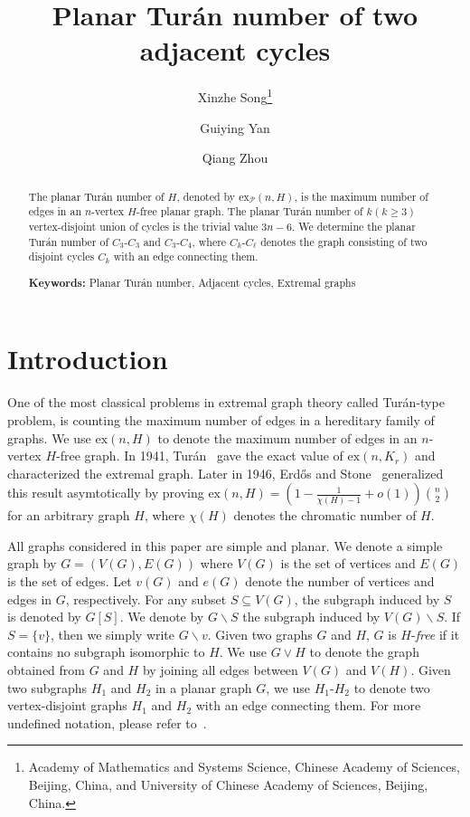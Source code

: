 \documentclass[12pt]{article}
\title{Planar Tur\'an number of two adjacent cycles}
\author{Xinzhe Song\thanks{Academy of Mathematics and Systems Science, Chinese Academy of Sciences, Beijing, China, and University of Chinese Academy of Sciences, Beijing, China.}
\and Guiying Yan\footnotemark[1]
\and Qiang Zhou\footnotemark[1]
}
\date{}
\newcommand{\ex}{\mathrm{ex}}
\begin{document}
\maketitle

\begin{abstract}
The planar Tur\'an number of $H$, denoted by $\ex_{\mathcal{P}}(n,H)$, is the maximum number of edges in an $n$-vertex $H$-free planar graph. The planar Tur\'an number of $k(k\geq 3)$ vertex-disjoint union of cycles is the trivial value $3n-6$. We determine the planar Tur\'an number of $C_{3}\text{-}C_{3}$ and $C_{3}\text{-}C_{4}$, where $C_{k}\text{-}C_{\ell}$ denotes the graph consisting of two disjoint cycles $C_k$ with an edge connecting them.


\textbf{Keywords:} Planar Tur\'an number, Adjacent cycles, Extremal graphs
\end{abstract}


\maketitle
\section{Introduction}

One of the most classical problems in extremal graph theory called Tur\'an-type problem, is counting the maximum number of edges in a hereditary family of graphs. We use $\ex(n,H)$ to denote the maximum number of edges in an $n$-vertex $H$-free graph. In 1941, Tur\'an~\cite{turan} gave the exact value of $\ex(n,K_{r})$ and characterized the extremal graph. Later in 1946, Erd\H{o}s and Stone~\cite{erdos1946} generalized this result asymtotically by proving $\ex(n,H)=(1-\frac{1}{\chi(H)-1}+o(1))\binom{n}{2}$ for an arbitrary graph $H$, where $\chi(H)$ denotes the chromatic number of $H$.

All graphs considered in this paper are simple and planar. We denote a simple graph by $G=(V(G),E(G))$ where $V(G)$ is the set of vertices and $E(G)$ is the set of edges. Let $v(G)$ and $e(G)$ denote the number of vertices and edges in $G$, respectively. For any subset $S\subseteq V(G)$, the subgraph induced by $S$ is denoted by $G[S]$. We denote by $G\backslash S$ the subgraph induced by $V(G)\backslash S$. If $S=\{v\}$, then we simply write $G\backslash v$. Given two graphs $G$ and $H$, $G$ is $H$-\emph{free} if it contains no subgraph isomorphic to $H$. We use $G \vee H$ to denote the graph obtained from $G$ and $H$ by joining all edges between $V(G)$ and $V(H)$. Given two subgraphs $H_1$ and $H_2$ in a planar graph $G$, we use $H_1\text{-}H_2$ to denote two vertex-disjoint graphs $H_1$ and $H_2$ with an edge connecting them. For more undefined notation, please refer to~\cite{graph-theory}.
\end{document}
